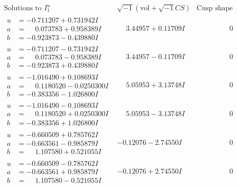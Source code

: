 \documentclass[1p]{elsarticle_modified}
\theoremstyle{definition}
\newcommand{\I}{\sqrt{-1}}
\begin{document}
$$\begin{array}{c|c|c}  
\text{Solutions to }I^u_{1}& \I (\text{vol} + \sqrt{-1}CS) & \text{Cusp shape}\\
 \hline 
\begin{aligned}
u &= -0.711207 + 0.731942 I \\
a &= \phantom{-}0.073783 + 0.958389 I \\
b &= -0.923873 - 0.439880 I\end{aligned}
 & \phantom{-}3.44957 + 0.11709 I & \phantom{-0.000000 } 0 \\ \hline\begin{aligned}
u &= -0.711207 - 0.731942 I \\
a &= \phantom{-}0.073783 - 0.958389 I \\
b &= -0.923873 + 0.439880 I\end{aligned}
 & \phantom{-}3.44957 - 0.11709 I & \phantom{-0.000000 } 0 \\ \hline\begin{aligned}
u &= -1.016490 + 0.108693 I \\
a &= \phantom{-}0.1180520 - 0.0250300 I \\
b &= -0.383356 - 1.026800 I\end{aligned}
 & \phantom{-}5.05953 + 3.13748 I & \phantom{-0.000000 } 0 \\ \hline\begin{aligned}
u &= -1.016490 - 0.108693 I \\
a &= \phantom{-}0.1180520 + 0.0250300 I \\
b &= -0.383356 + 1.026800 I\end{aligned}
 & \phantom{-}5.05953 - 3.13748 I & \phantom{-0.000000 } 0 \\ \hline\begin{aligned}
u &= -0.660509 + 0.785762 I \\
a &= -0.663561 - 0.985879 I \\
b &= \phantom{-}1.107580 + 0.521055 I\end{aligned}
 & -0.12076 - 2.74550 I & \phantom{-0.000000 } 0 \\ \hline\begin{aligned}
u &= -0.660509 - 0.785762 I \\
a &= -0.663561 + 0.985879 I \\
b &= \phantom{-}1.107580 - 0.521055 I\end{aligned}
 & -0.12076 + 2.74550 I & \phantom{-0.000000 } 0 \\ \hline\begin{aligned}

\end{aligned}
\end{array}$$
\end{document}
